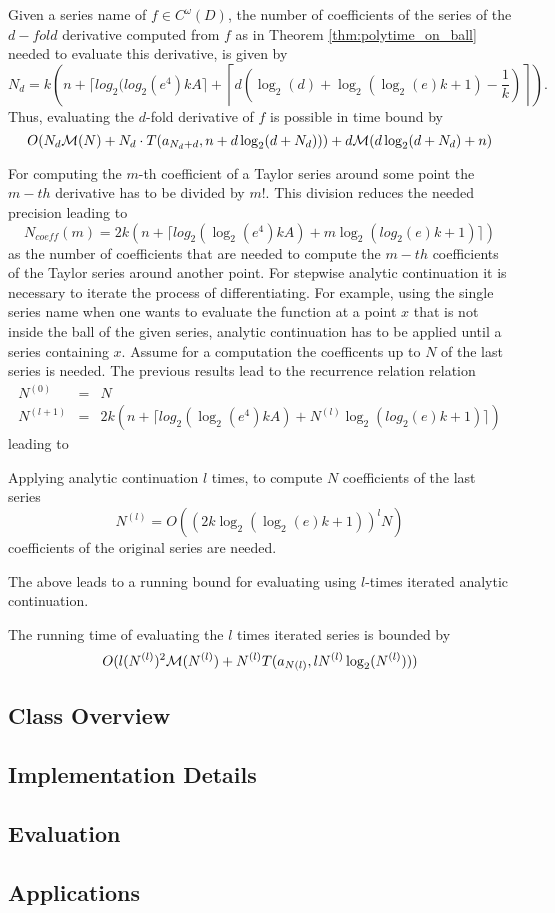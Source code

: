 		\begin{theorem}
			Given a series name of $f \in C^\omega(D)$, the number of coefficients of the series of the $d-fold$ derivative computed from $f$ as in Theorem \ref{thm:polytime_on_ball} needed to evaluate this derivative, is given by 
			$$N_d = k\left(n+\lceil log_2(log_2 (e^4) kA \rceil+\left \lceil d\left(\log_2(d)+\log_2(\log_2(e)k+1)-\frac{1}{k}\right)\right\rceil\right).$$
			Thus, evaluating the $d$-fold derivative of $f$ is possible in time bound by
			$$ O(N_d\mathcal M(N)+N_d \cdot T(a_{N_d+d}, n+d\log_2(d+N_d)))+d\mathcal M(d \log_2 (d+N_d)+n) $$ 
		\end{theorem}
		For computing the $m$-th coefficient of a Taylor series around some point the $m-th$ derivative 
		has to be divided by $m!$. This division reduces the needed precision leading to 
		$$N_{coeff}(m) = 2k\left( n+\lceil log_2(\log_2 (e^4) kA) + m \log_2(log_2(e)k+1)\rceil \right)$$
		as the number of coefficients that are needed to compute the $m-th$ coefficients of the Taylor series 
		around another point. 
		For stepwise analytic continuation it is necessary to iterate the process of differentiating.
		For example, using the single series name when one wants to evaluate the function at a point $x$
		that is not inside the ball of the given series, analytic continuation has to be applied until a series
		containing $x$.
		Assume for a computation the coefficents up to $N$ of the last series is needed. 
		The previous results lead to the recurrence relation
		relation 
		\begin{eqnarray*}
			N^{(0)} &=& N \\
			N^{(l+1)} &=& 2k\left( n+\lceil log_2(\log_2 (e^4) kA) + N^{(l)} \log_2(log_2(e)k+1)\rceil \right)
		\end{eqnarray*}
		leading to
		\begin{theorem}
			Applying analytic continuation $l$ times, to compute $N$ coefficients of the last series 
			\begin{equation}
				N^{(l)} = O((2k \log_2 (\log_2 (e)k +1))^lN) 
			\end{equation}
			coefficients of the original series are needed.
		\end{theorem}
		The above leads to a running bound for evaluating using $l$-times iterated analytic continuation.
		\begin{theorem}
			The running time of evaluating the $l$ times iterated series is bounded by
			\begin{equation}
				 O(l(N^{(l)})^2\mathcal M(N^{(l)})+N^{(l)}T(a_{N(l)}, l N^{(l)}\log_2(N^{(l)}))) 
			\end{equation}
		\end{theorem}
	\subsection{Class Overview}
	\subsection{Implementation Details}
	\subsection{Evaluation}
	\subsection{Applications}